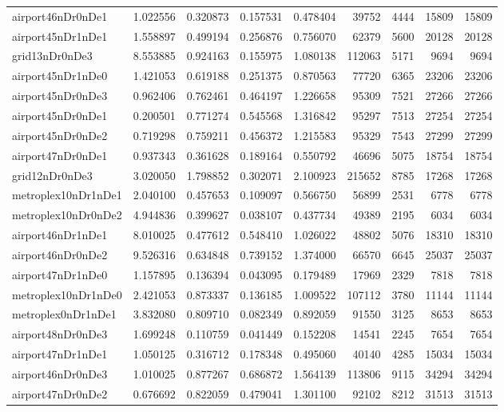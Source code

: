 \documentclass[../../../thesis.tex]{subfiles}
\begin{document}
\begin{longtable}{|l|r|r|r|r|r|r|r|r|}
airport46nDr0nDe1 & 1.022556 & 0.320873 & 0.157531 & 0.478404 & 39752 & 4444 & 15809 & 15809 \\
airport45nDr1nDe1 & 1.558897 & 0.499194 & 0.256876 & 0.756070 & 62379 & 5600 & 20128 & 20128 \\
grid13nDr0nDe3 & 8.553885 & 0.924163 & 0.155975 & 1.080138 & 112063 & 5171 & 9694 & 9694 \\
airport45nDr1nDe0 & 1.421053 & 0.619188 & 0.251375 & 0.870563 & 77720 & 6365 & 23206 & 23206 \\
airport45nDr0nDe3 & 0.962406 & 0.762461 & 0.464197 & 1.226658 & 95309 & 7521 & 27266 & 27266 \\
airport45nDr0nDe1 & 0.200501 & 0.771274 & 0.545568 & 1.316842 & 95297 & 7513 & 27254 & 27254 \\
airport45nDr0nDe2 & 0.719298 & 0.759211 & 0.456372 & 1.215583 & 95329 & 7543 & 27299 & 27299 \\
airport47nDr0nDe1 & 0.937343 & 0.361628 & 0.189164 & 0.550792 & 46696 & 5075 & 18754 & 18754 \\
grid12nDr0nDe3 & 3.020050 & 1.798852 & 0.302071 & 2.100923 & 215652 & 8785 & 17268 & 17268 \\
metroplex10nDr1nDe1 & 2.040100 & 0.457653 & 0.109097 & 0.566750 & 56899 & 2531 & 6778 & 6778 \\
metroplex10nDr0nDe2 & 4.944836 & 0.399627 & 0.038107 & 0.437734 & 49389 & 2195 & 6034 & 6034 \\
airport46nDr1nDe1 & 8.010025 & 0.477612 & 0.548410 & 1.026022 & 48802 & 5076 & 18310 & 18310 \\
airport46nDr0nDe2 & 9.526316 & 0.634848 & 0.739152 & 1.374000 & 66570 & 6645 & 25037 & 25037 \\
airport47nDr1nDe0 & 1.157895 & 0.136394 & 0.043095 & 0.179489 & 17969 & 2329 & 7818 & 7818 \\
metroplex10nDr1nDe0 & 2.421053 & 0.873337 & 0.136185 & 1.009522 & 107112 & 3780 & 11144 & 11144 \\
metroplex0nDr1nDe1 & 3.832080 & 0.809710 & 0.082349 & 0.892059 & 91550 & 3125 & 8653 & 8653 \\
airport48nDr0nDe3 & 1.699248 & 0.110759 & 0.041449 & 0.152208 & 14541 & 2245 & 7654 & 7654 \\
airport47nDr1nDe1 & 1.050125 & 0.316712 & 0.178348 & 0.495060 & 40140 & 4285 & 15034 & 15034 \\
airport46nDr0nDe3 & 1.010025 & 0.877267 & 0.686872 & 1.564139 & 113806 & 9115 & 34294 & 34294 \\
airport47nDr0nDe2 & 0.676692 & 0.822059 & 0.479041 & 1.301100 & 92102 & 8212 & 31513 & 31513 \\

\end{longtable}
\end{document}
